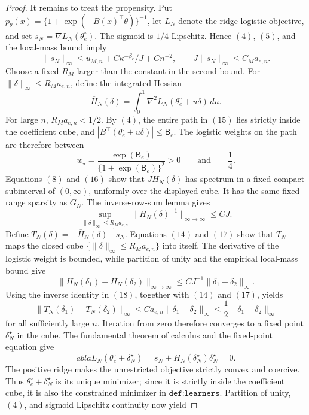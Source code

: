 \documentclass{article}
\begin{document}
\begin{proof}
It remains to treat the propensity. Put \(p_\theta(x)=\{1+\exp(-B(x)^\top\theta)\}^{-1}\), let \(L_N\) denote the ridge-logistic objective, and set \(s_N=\nabla L_N(\theta_e^\circ)\). The sigmoid is \(1/4\)-Lipschitz. Hence \((4)\), \((5)\), and the local-mass bound imply
\[\lVert s_N\rVert_\infty\le u_{M,n}+C\kappa^{-\beta_e}/J+Cn^{-2},\qquad J\lVert s_N\rVert_\infty\le C_Ma_{e,n}.\tag{14}\]
Choose a fixed \(R_M\) larger than the constant in the second bound. For \(\lVert\delta\rVert_\infty\le R_Ma_{e,n}\), define the integrated Hessian
\[\overline H_N(\delta)=\int_0^1\nabla^2L_N(\theta_e^\circ+u\delta)\,du.\tag{15}\]
For large \(n\), \(R_Ma_{e,n}<1/2\). By \((4)\), the entire path in \((15)\) lies strictly inside the coefficient cube, and \(|B^\top(\theta_e^\circ+u\delta)|\le\mathsf B_e\). The logistic weights on the path are therefore between
\[w_\star=\frac{\exp(\mathsf B_e)}{\{1+\exp(\mathsf B_e)\}^2}>0\qquad\text{and}\qquad\frac14.\tag{16}\]
Equations \((8)\) and \((16)\) show that \(J\overline H_N(\delta)\) has spectrum in a fixed compact subinterval of \((0,\infty)\), uniformly over the displayed cube. It has the same fixed-range sparsity as \(G_N\). The inverse-row-sum lemma gives
\[\sup_{\lVert\delta\rVert_\infty\le R_Ma_{e,n}}\lVert\overline H_N(\delta)^{-1}\rVert_{\infty\to\infty}\le CJ.\tag{17}\]
Define \(T_N(\delta)=-\overline H_N(\delta)^{-1}s_N\). Equations \((14)\) and \((17)\) show that \(T_N\) maps the closed cube \(\{\lVert\delta\rVert_\infty\le R_Ma_{e,n}\}\) into itself. The derivative of the logistic weight is bounded, while partition of unity and the empirical local-mass bound give
\[\lVert\overline H_N(\delta_1)-\overline H_N(\delta_2)\rVert_{\infty\to\infty}\le CJ^{-1}\lVert\delta_1-\delta_2\rVert_\infty.\tag{18}\]
Using the inverse identity in \((18)\), together with \((14)\) and \((17)\), yields
\[\lVert T_N(\delta_1)-T_N(\delta_2)\rVert_\infty\le Ca_{e,n}\lVert\delta_1-\delta_2\rVert_\infty\le\frac12\lVert\delta_1-\delta_2\rVert_\infty\tag{19}\]
for all sufficiently large \(n\). Iteration from zero therefore converges to a fixed point \(\delta_N^\star\) in the cube. The fundamental theorem of calculus and the fixed-point equation give
\[
abla L_N(\theta_e^\circ+\delta_N^\star)=s_N+\overline H_N(\delta_N^\star)\delta_N^\star=0.\tag{20}\]
The positive ridge makes the unrestricted objective strictly convex and coercive. Thus \(\theta_e^\circ+\delta_N^\star\) is its unique minimizer; since it is strictly inside the coefficient cube, it is also the constrained minimizer in \(\texttt{def:learners}\). Partition of unity, \((4)\), and sigmoid Lipschitz continuity now yield

\end{proof}
\end{document}
